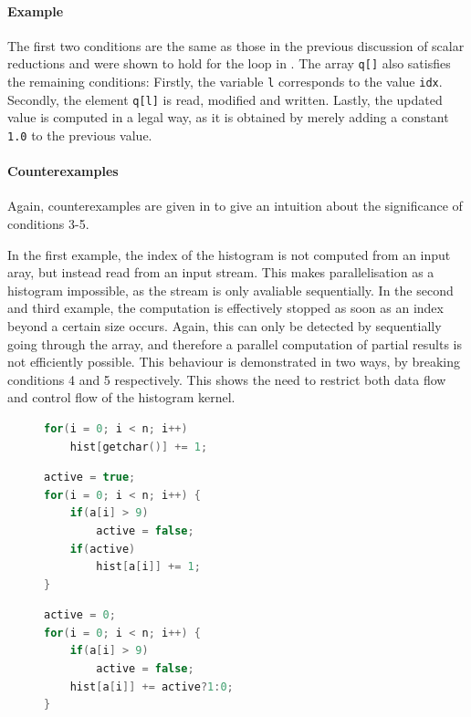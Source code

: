     \paragraph*{Example}
    The first two conditions are the same as those in the previous discussion of
    scalar reductions and were shown to hold for the loop in
    .
    The array \texttt{q[]} also satisfies the remaining conditions:
    Firstly, the variable \texttt{l} corresponds to the value \texttt{idx}.
    Secondly, the element \texttt{q[l]} is read, modified and written.
    Lastly, the updated value is computed in a legal way, as it is obtained by
    merely adding a constant \texttt{1.0} to the previous value.

    \paragraph*{Counterexamples}
    Again, counterexamples are given in  to give an
    intuition about the significance of conditions 3-5.

    In the first example, the index of the histogram is not computed from an
    input aray, but instead read from an input stream.
    This makes parallelisation as a histogram impossible, as the stream is only
    avaliable sequentially.
    In the second and third example, the computation is effectively stopped as
    soon as an index beyond a certain size occurs.
    Again, this can only be detected by sequentially going through the array,
    and therefore a parallel computation of partial results is not efficiently
    possible.
    This behaviour is demonstrated in two ways, by breaking conditions 4 and 5
    respectively.
    This shows the need to restrict both data flow and control flow of the
    histogram kernel.

\begin{figure}[t]
\begin{lstlisting}[language=C++]
for(i = 0; i < n; i++)
    hist[getchar()] += 1;
\end{lstlisting}
\begin{lstlisting}[language=C++]
active = true;
for(i = 0; i < n; i++) {
    if(a[i] > 9)
        active = false;
    if(active)
        hist[a[i]] += 1;
}
\end{lstlisting}
\begin{lstlisting}[language=C++,label={counterexamples2},caption=
   {Counterexamples to the last three conditions:
    None of these computations can be parallelised as histograms.
    The final two example loops implement the same functionality.
    \parfillskip=0pt}]
active = 0;
for(i = 0; i < n; i++) {
    if(a[i] > 9)
        active = false;
    hist[a[i]] += active?1:0;
}
\end{lstlisting}
\end{figure}

